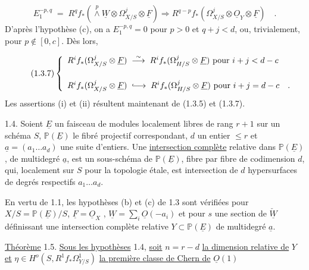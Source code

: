 \begin{equation}\tag{1.3.6}
E_1^{-p,q} \; = \; R^q f_*( \stackrel{p}{\wedge}\underline{W} \otimes \Omega^j_{X/S} \otimes \underline{F}) \Longrightarrow R^{q-p} f_*(\Omega^j_{X/S} \otimes \underline{O}_Y \otimes \underline{F}) \quad .
\end{equation}
D'après l'hypothèse (c), on a $E_1^{-p,q} = 0$ pour $p > 0$ et $q+j < d$, ou, trivialement, pour $p \notin [0,c]$. Dès lors,

\begin{equation}\tag{1.3.7}
\left\{ \begin{array}{l} R^i f_*(\Omega^j_{X/S} \otimes \underline{F}) \; \stackrel{\sim}{\longrightarrow} \; R^i f_*(\Omega^j_{H/S} \otimes \underline{F}) \mbox{ pour } i+j < d-c \\[4ex] R^i f_*(\Omega^j_{X/S} \otimes \underline{F}) \; \lhook\joinrel\longrightarrow \; R^i f_*(\Omega^j_{H/S} \otimes \underline{F}) \mbox{ pour } i+j = d-c \quad . \end{array} \right.
\end{equation}
Les assertions (i) et (ii) résultent maintenant de (1.3.5) et (1.3.7).



1.4. Soient $\underline{E}$ un faisceau de modules localement libres de rang $r+1$ sur un schéma $S$, $\mathbb{P}(\underline{E})$ le fibré projectif correspondant, $d$ un entier $\leq r$ et $\underline{a} = (a_1 \ldots a_d)$ une suite d'entiers. Une \underline{intersection complète} relative dans $\mathbb{P}(\underline{E})$, de multidegré $\underline{a}$, est un sous-schéma de $\mathbb{P}(\underline{E})$, fibre par fibre de codimension $d$, qui, localement sur $S$ pour la topologie étale, est intersection de $d$ hypersurfaces de degrés respectifs $a_1 \ldots a_d$.

En vertu de 1.1, les hypothèses (b) et (c) de 1.3 sont vérifiées pour $X/S = \mathbb{P}(\underline{E})/S$, $\underline{F} = \underline{O}_X$ , $\underline{W} = \sum\limits_i \underline{O}(-a_i)$ et pour $s$ une section de $\check{\underline{W}}$ définissant une intersection complète relative $Y \subset \mathbb{P}(\underline{E})$ de multidegré $\underline{a}$.

\underline{Théorème} 1.5. \underline{Sous les hypothèses} 1.4, \underline{soit} $n = r-d$ \underline{la dimension relative de} $Y$ \underline{et} $\eta \in H^o(S,R^1f_*\Omega^1_{Y/S})$ \underline{la première classe de Chern de} $\underline{O}(1)$

